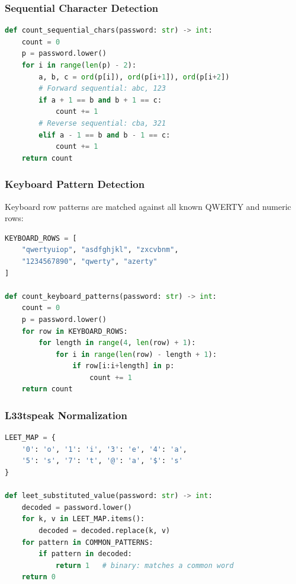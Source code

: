 \documentclass[12pt,a4paper]{article}
\begin{document}
\subsubsection{Sequential Character Detection}

\begin{lstlisting}[language=Python, caption={Sequential Character Detection Algorithm}]
def count_sequential_chars(password: str) -> int:
    count = 0
    p = password.lower()
    for i in range(len(p) - 2):
        a, b, c = ord(p[i]), ord(p[i+1]), ord(p[i+2])
        # Forward sequential: abc, 123
        if a + 1 == b and b + 1 == c:
            count += 1
        # Reverse sequential: cba, 321
        elif a - 1 == b and b - 1 == c:
            count += 1
    return count
\end{lstlisting}

\subsubsection{Keyboard Pattern Detection}

Keyboard row patterns are matched against all known QWERTY and numeric rows:

\begin{lstlisting}[language=Python, caption={Keyboard Pattern Detection}]
KEYBOARD_ROWS = [
    "qwertyuiop", "asdfghjkl", "zxcvbnm",
    "1234567890", "qwerty", "azerty"
]

def count_keyboard_patterns(password: str) -> int:
    count = 0
    p = password.lower()
    for row in KEYBOARD_ROWS:
        for length in range(4, len(row) + 1):
            for i in range(len(row) - length + 1):
                if row[i:i+length] in p:
                    count += 1
    return count
\end{lstlisting}

\subsubsection{L33tspeak Normalization}

\begin{lstlisting}[language=Python, caption={L33tspeak Decoding for Fragment Matching}]
LEET_MAP = {
    '0': 'o', '1': 'i', '3': 'e', '4': 'a',
    '5': 's', '7': 't', '@': 'a', '$': 's'
}

def leet_substituted_value(password: str) -> int:
    decoded = password.lower()
    for k, v in LEET_MAP.items():
        decoded = decoded.replace(k, v)
    for pattern in COMMON_PATTERNS:
        if pattern in decoded:
            return 1   # binary: matches a common word
    return 0
\end{lstlisting}
\end{document}
